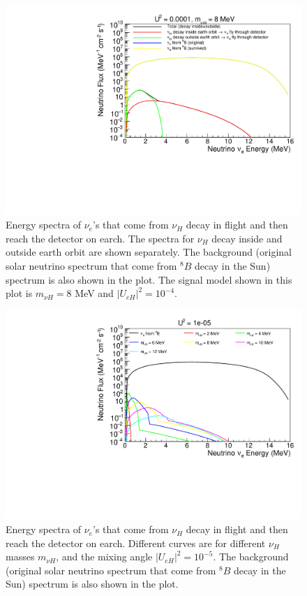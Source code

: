 \documentclass[%
 reprint,
 amsmath,amssymb,
 aps,
 prd,
twocolumn,
]{revtex4-1}
\begin{document}
\begin{figure}[!ht]
\includegraphics[width=0.99\columnwidth]{../plots/DecayInFlightNuLEnergy_U0.0001_M8.0_InsideOutside_linXlogY.pdf}
\caption{Energy spectra of $\nu_e$'s that come from $\nu_H$ decay in flight and then reach the detector on earch. The spectra for $\nu_H$ decay inside and outside earth orbit are shown separately. The background (original solar neutrino spectrum that come from $^8 B$ decay in the Sun) spectrum is also shown in the plot. The signal model shown in this plot is $m_{\nu H} = 8$ MeV and $|U_{eH}|^2 = 10^{-4}$.}
\label{fig:DecayInFlightSpectrum_U0.0001_M8} 
\end{figure}

\begin{figure}[!ht]
\includegraphics[width=0.99\columnwidth]{../plots/DecayInFlightNuLEnergy_U1e-05_AllMass_linXlogY.pdf}
\caption{Energy spectra of $\nu_e$'s that come from $\nu_H$ decay in flight and then reach the detector on earch. Different curves are for different $\nu_H$ masses $m_{\nu H}$, and the mixing angle $|U_{eH}|^2 = 10^{-5}$. 
The background (original solar neutrino spectrum that come from $^8 B$ decay in the Sun) spectrum is also shown in the plot.}
\label{fig:DecayInFlightSpectrum_U1em5_AllMass}
\end{figure}
\end{document}
